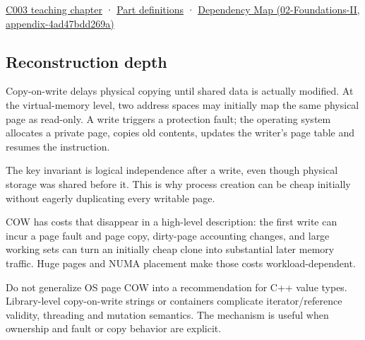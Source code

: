 \hyperref[01-foundations-i-ch002-where-the-bytes-live]{C003 teaching chapter} · \hyperref[appendix-fd090d982a15-m003---parts-41-60]{Part definitions} · \href{../02-Foundations-II/main.pdf\#nameddest=appendix-4ad47bdd269a}{Dependency Map (02-Foundations-II, appendix-4ad47bdd269a)}

\subsection{Reconstruction depth}\label{appendix-7a06e5baac04-reconstruction-depth}

Copy-on-write delays physical copying until shared data is actually modified. At the virtual-memory level, two address spaces may initially map the same physical page as read-only. A write triggers a protection fault; the operating system allocates a private page, copies old contents, updates the writer's page table and resumes the instruction.

The key invariant is logical independence after a write, even though physical storage was shared before it. This is why process creation can be cheap initially without eagerly duplicating every writable page.

COW has costs that disappear in a high-level description: the first write can incur a page fault and page copy, dirty-page accounting changes, and large working sets can turn an initially cheap clone into substantial later memory traffic. Huge pages and NUMA placement make those costs workload-dependent.

Do not generalize OS page COW into a recommendation for C++ value types. Library-level copy-on-write strings or containers complicate iterator/reference validity, threading and mutation semantics. The mechanism is useful when ownership and fault or copy behavior are explicit.

